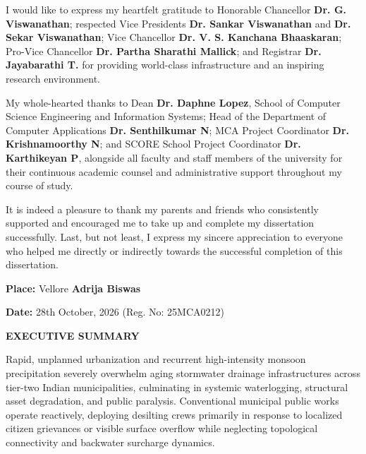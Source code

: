 \documentclass[12pt,a4paper]{report}
\begin{document}
\vspace{0.5cm}
\noindent I would like to express my heartfelt gratitude to Honorable Chancellor \textbf{Dr. G. Viswanathan}; respected Vice Presidents \textbf{Dr. Sankar Viswanathan} and \textbf{Dr. Sekar Viswanathan}; Vice Chancellor \textbf{Dr. V. S. Kanchana Bhaaskaran}; Pro-Vice Chancellor \textbf{Dr. Partha Sharathi Mallick}; and Registrar \textbf{Dr. Jayabarathi T.} for providing world-class infrastructure and an inspiring research environment.

\vspace{0.5cm}
\noindent My whole-hearted thanks to Dean \textbf{Dr. Daphne Lopez}, School of Computer Science Engineering and Information Systems; Head of the Department of Computer Applications \textbf{Dr. Senthilkumar N}; MCA Project Coordinator \textbf{Dr. Krishnamoorthy N}; and SCORE School Project Coordinator \textbf{Dr. Karthikeyan P}, alongside all faculty and staff members of the university for their continuous academic counsel and administrative support throughout my course of study.

\vspace{0.5cm}
\noindent It is indeed a pleasure to thank my parents and friends who consistently supported and encouraged me to take up and complete my dissertation successfully. Last, but not least, I express my sincere appreciation to everyone who helped me directly or indirectly towards the successful completion of this dissertation.

\vspace{1.5cm}
\noindent \textbf{Place:} Vellore \hfill \textbf{Adrija Biswas}

\vspace{0.2cm}
\noindent \textbf{Date:} 28th October, 2026 \hfill (Reg. No: 25MCA0212)

\clearpage



\thispagestyle{plain}
\begin{center}
    {\fontsize{14pt}{18pt}\selectfont \textbf{EXECUTIVE SUMMARY}\par}
\end{center}
\vspace{0.8cm}

\noindent Rapid, unplanned urbanization and recurrent high-intensity monsoon precipitation severely overwhelm aging stormwater drainage infrastructures across tier-two Indian municipalities, culminating in systemic waterlogging, structural asset degradation, and public paralysis. Conventional municipal public works operate reactively, deploying desilting crews primarily in response to localized citizen grievances or visible surface overflow while neglecting topological connectivity and backwater surcharge dynamics. 
\end{document}
